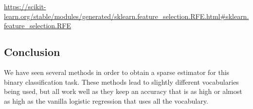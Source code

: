 \documentclass[
10pt, %
a4paper, %
oneside, %
headinclude,footinclude, %
BCOR5mm, %
]{scrartcl}
\begin{document}
\url{https://scikit-learn.org/stable/modules/generated/sklearn.feature_selection.RFE.html#sklearn.feature_selection.RFE} 

\subsection{Conclusion}

We have seen several methods in order to obtain a sparse estimator for this binary classification task. These methods lead to slightly different vocabularies being used, but all work well as they keep an accuracy that is as high or almost as high as the vanilla logistic regression that uses all the vocabulary.
\end{document}
